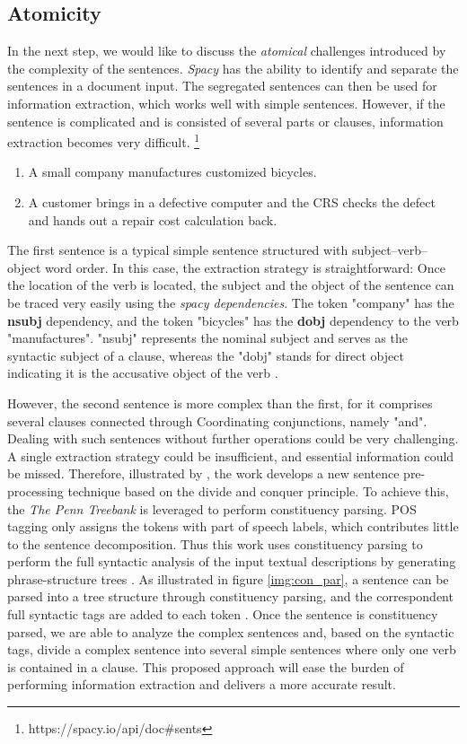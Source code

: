 \subsection{Atomicity}

In the next step, we would like to discuss the \textit{atomical} challenges introduced by the complexity of the sentences. \textit{Spacy} has the ability to identify and separate the sentences in a document input. The segregated sentences can then be used for information extraction, which works well with simple sentences. However, if the sentence is complicated and is consisted of several parts or clauses, information extraction becomes very difficult. \footnote{https://spacy.io/api/doc\#sents}

\begin{enumerate}
    \item A small company manufactures customized bicycles.
    \item A customer brings in a defective computer and the CRS checks the defect and hands out a repair cost calculation back.
\end{enumerate}

The first sentence is a typical simple sentence structured with subject–verb–object word order. In this case, the extraction strategy is straightforward: Once the location of the verb is located, the subject and the object of the sentence can be traced very easily using the \textit{spacy dependencies}. The token "company" has the \textbf{nsubj} dependency, and the token "bicycles" has the \textbf{dobj} dependency to the verb "manufactures". "nsubj" represents the nominal subject and serves as the syntactic subject of a clause, whereas the "dobj" stands for direct object indicating it is the accusative object of the verb \cite{dependencies_manual}.

However, the second sentence is more complex than the first, for it comprises several clauses connected through Coordinating conjunctions, namely "and". Dealing with such sentences without further operations could be very challenging. A single extraction strategy could be insufficient, and essential information could be missed. Therefore, illustrated by \cite{t2m_1}, the work develops a new sentence pre-processing technique based on the divide and conquer principle. To achieve this, the \textit{The Penn Treebank} is leveraged to perform constituency parsing. POS tagging only assigns the tokens with part of speech labels, which contributes little to the sentence decomposition. Thus this work uses constituency parsing to perform the full syntactic analysis of the input textual descriptions by generating phrase-structure trees \cite{parser_01}. As illustrated in figure \ref{img:con_par}, a sentence can be parsed into a tree structure through constituency parsing, and the correspondent full syntactic tags are added to each token \cite{penn_tree_explanation_1} \cite{penn_tree}. Once the sentence is constituency parsed, we are able to analyze the complex sentences and, based on the syntactic tags, divide a complex sentence into several simple sentences where only one verb is contained in a clause. This proposed approach will ease the burden of performing information extraction and delivers a more accurate result.


